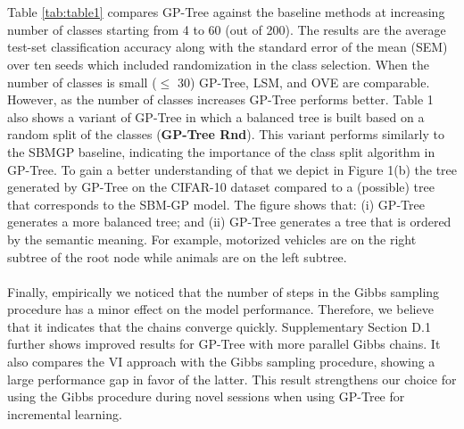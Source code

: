 \documentclass[preprint,11pt]{elsarticle}
\begin{document}
        \\
        \\
        Table \ref{tab:table1} compares GP-Tree against the baseline methods
        at increasing number of classes starting from 4 to 60 (out
        of 200). The results are the average test-set classification
        accuracy along with the standard error of the mean (SEM)
        over ten seeds which included randomization in the class
        selection. When the number of classes is small ($\leq$ 30)
        GP-Tree, LSM, and OVE are comparable. However, as
        the number of classes increases GP-Tree performs better.
        Table 1 also shows a variant of GP-Tree in which a balanced
        tree is built based on a random split of the classes (\textbf{GP-Tree
        Rnd}). This variant performs similarly to the SBMGP
        baseline, indicating the importance of the class split
        algorithm in GP-Tree. To gain a better understanding of
        that we depict in Figure 1(b) the tree generated by GP-Tree
        on the CIFAR-10 dataset compared to a (possible) tree that
        corresponds to the SBM-GP model. The figure shows that:
        (i) GP-Tree generates a more balanced tree; and (ii) GP-Tree
        generates a tree that is ordered by the semantic meaning.
        For example, motorized vehicles are on the right subtree of
        the root node while animals are on the left subtree.
        \\
        \\
        Finally, empirically we noticed that the number of steps
        in the Gibbs sampling procedure has a minor effect on the
        model performance. Therefore, we believe that it indicates
        that the chains converge quickly. Supplementary Section D.1
        further shows improved results for GP-Tree with more parallel
        Gibbs chains. It also compares the VI approach with
        the Gibbs sampling procedure, showing a large performance
        gap in favor of the latter. This result strengthens our choice
        for using the Gibbs procedure during novel sessions when
        using GP-Tree for incremental learning.
\end{document}
